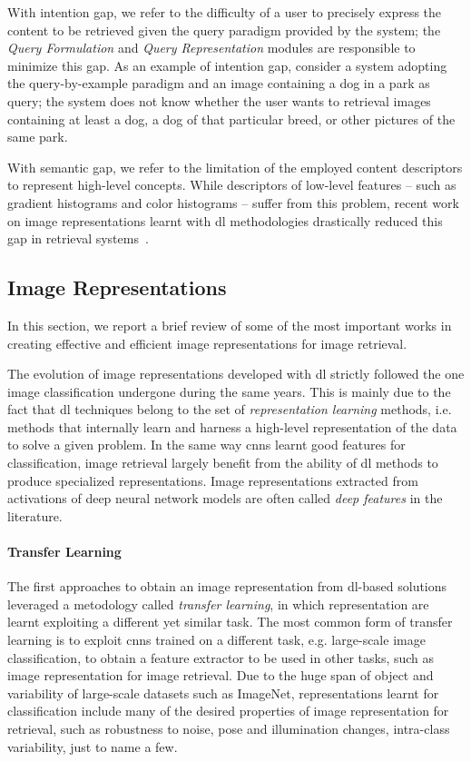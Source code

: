 With intention gap, we refer to the difficulty of a user to precisely express the content to be retrieved given the query paradigm provided by the system;
the \emph{Query Formulation} and \emph{Query Representation} modules are responsible to minimize this gap.
As an example of intention gap, consider a system adopting the query-by-example paradigm and an image containing a dog in a park as query;
the system does not know whether the user wants to retrieval images containing at least a dog, a dog of that particular breed, or other pictures of the same park.

With semantic gap, we refer to the limitation of the employed content descriptors to represent high-level concepts.
While descriptors of low-level features -- such as gradient histograms and color histograms -- suffer from this problem, recent work on image representations learnt with \gls{dl} methodologies drastically reduced this gap in retrieval systems~\cite{}.

\subsection{Image Representations}
In this section, we report a brief review of some of the most important works in creating effective and efficient image representations for image retrieval.

The evolution of image representations developed with \gls{dl} strictly followed the one image classification undergone during the same years.
This is mainly due to the fact that \acrlong{dl} techniques belong to the set of \emph{representation learning} methods, i.e. methods that internally learn and harness a high-level representation of the data to solve a given problem.
In the same way \glspl{cnn} learnt good features for classification, image retrieval largely benefit from the ability of \gls{dl} methods to produce specialized representations.
Image representations extracted from activations of deep neural network models are often called \emph{deep features} in the literature.

\paragraph{Transfer Learning}
The first approaches to obtain an image representation from \gls{dl}-based solutions leveraged a metodology called \emph{transfer learning}, in which representation are learnt exploiting a different yet similar task.
The most common form of transfer learning is to exploit \glspl{cnn} trained on a different task, e.g. large-scale image classification, to obtain a feature extractor to be used in other tasks, such as image representation for image retrieval.
Due to the huge span of object and variability of large-scale datasets such as ImageNet, representations learnt for classification include many of the desired properties of image representation for retrieval, such as robustness to noise, pose and illumination changes, intra-class variability, just to name a few.

